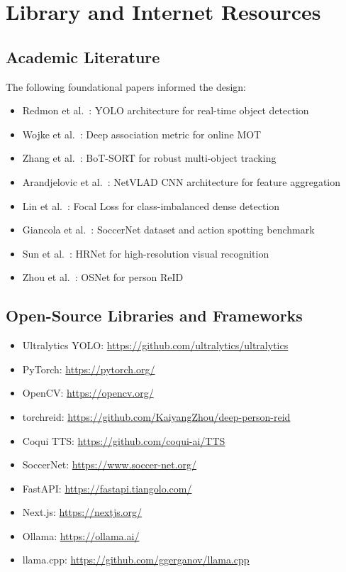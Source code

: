 \documentclass[10pt,twocolumn,a4paper]{article}
\begin{document}
\section{Library and Internet Resources}

\subsection{Academic Literature}

The following foundational papers informed the design:
\begin{itemize}[noitemsep,topsep=0pt]
  \item Redmon et al.~\cite{redmon2016yolo}: YOLO architecture for real-time object detection
  \item Wojke et al.~\cite{wojke2017deepsort}: Deep association metric for online MOT
  \item Zhang et al.~\cite{zhang2022botsort}: BoT-SORT for robust multi-object tracking
  \item Arandjelovic et al.~\cite{arandjelovic2016netvlad}: NetVLAD CNN architecture for feature aggregation
  \item Lin et al.~\cite{lin2017focal}: Focal Loss for class-imbalanced dense detection
  \item Giancola et al.~\cite{soccernet}: SoccerNet dataset and action spotting benchmark
  \item Sun et al.~\cite{sun2019hrnet}: HRNet for high-resolution visual recognition
  \item Zhou et al.~\cite{zhou2019osnet}: OSNet for person ReID
\end{itemize}

\subsection{Open-Source Libraries and Frameworks}

\begin{itemize}[noitemsep,topsep=0pt]
  \item Ultralytics YOLO: \url{https://github.com/ultralytics/ultralytics}
  \item PyTorch: \url{https://pytorch.org/}
  \item OpenCV: \url{https://opencv.org/}
  \item torchreid: \url{https://github.com/KaiyangZhou/deep-person-reid}
  \item Coqui TTS: \url{https://github.com/coqui-ai/TTS}
  \item SoccerNet: \url{https://www.soccer-net.org/}
  \item FastAPI: \url{https://fastapi.tiangolo.com/}
  \item Next.js: \url{https://nextjs.org/}
  \item Ollama: \url{https://ollama.ai/}
  \item llama.cpp: \url{https://github.com/ggerganov/llama.cpp}
\end{itemize}
\end{document}
